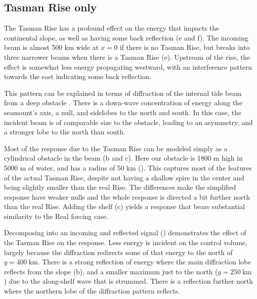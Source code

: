 \documentclass[10pt]{article}
\newcommand{\tempS}[1]{}
\newcommand{\mn}[1]{{\sc #1}}
\begin{document}
\subsection{Tasman Rise only}

The Tasman Rise has a profound effect on the energy that impacts the continental slope, as well as having some back reflection (e and f).  The incoming beam is almost 500 km wide at $x=0$ if there is no Tasman Rise, but breaks into three narrower beams when there is a Tasman Rise (e).  Upstream of the rise, the effect is somewhat less energy propagating westward, with an  interference pattern towards the east indicating some back reflection.  



This pattern can be explained in terms of diffraction of the internal tide beam from a deep obstacle \citep[i.e.][]{johnstonetal03}.  There is a down-wave concentration of energy along the seamount's axis, a null, and sidelobes to the north and south.  In this case, the incident beam is of comparable size to the obstacle, leading to an asymmetry, and a stronger lobe to the north than south.  

Most of the response due to the Tasman Rise can be modeled simply as a cylindrical obstacle in the beam (b and c).  Here our obstacle is 1800 m high in 5000 m of water, and has a radius of 50 km ().  This captures most of the features of the actual Tasman Rise, despite not having a shallow spire in the center and being slightly smaller than the real Rise.  The differences make the simplified response have weaker nulls and the whole response is directed a bit further north than the real Rise.  Adding the shelf (c) yields a response that bears substantial similarity to the \mn{Real} forcing case.  

Decomposing into an incoming and reflected signal () demonstrates the effect of the Tasman Rise on the response.  Less energy is incident on the control volume, largely because the diffraction redirects some of that energy to the north of $y=400\ \mathrm{km}$.  There is a strong reflection of energy where the main diffraction lobe reflects from the slope (b), and a smaller maximum just to the north ($y=250\ \mathrm{km}$) due to the along-shelf wave that is strummed.  There is a reflection further north where the northern lobe of the diffraction pattern reflects.  
\end{document}
